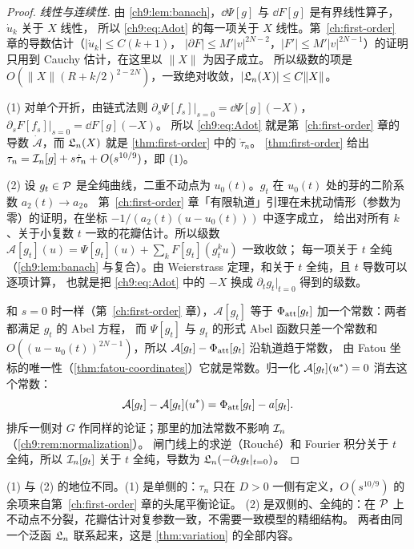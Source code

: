 \begin{proof}
\emph{线性与连续性.} 由 \cref{ch9:lem:banach}，$\dd\Psi[g]$ 与 $\dd F[g]$ 是有界线性算子，$\dot u_k$ 关于 $X$ 线性，
所以 \eqref{ch9:eq:Adot} 的每一项关于 $X$ 线性。第~\ref{ch:first-order} 章的导数估计（$|\dot u_k|\le C(k+1)$，
$|\partial F|\le M'|v|^{2N-2}$，$|F'|\le M'|v|^{2N-1}$）的证明只用到 Cauchy 估计，在这里以 $\|X\|$ 为因子成立。
所以级数的项是 $O(\|X\|(R+k/2)^{2-2N})$，一致绝对收敛，$|\mathfrak L_n(X)|\le C\|X\|$。

(1) 对单个开折，由链式法则 $\partial_s\Psi[f_s]|_{s=0}=\dd\Psi[g](-X)$，$\partial_sF[f_s]|_{s=0}=\dd F[g](-X)$。
所以 \eqref{ch9:eq:Adot} 就是第~\ref{ch:first-order} 章的导数 $\dot{\mathcal A}$，而 $\mathfrak L_n(X)$ 就是 \cref{thm:first-order} 中的 $\dot\tau_n$。
\cref{thm:first-order} 给出 $\tau_n=\mathcal I_n[g]+s\dot\tau_n+O(s^{10/9})$，即 (1)。

(2) 设 $g_t\in\mathcal P$ 是全纯曲线，二重不动点为 $u_0(t)$。$g_t$ 在 $u_0(t)$ 处的芽的二阶系数 $a_2(t)\to a_2$。
第~\ref{ch:first-order} 章「有限轨道」引理在未扰动情形（参数为零）的证明，在坐标 $-1/(a_2(t)(u-u_0(t)))$ 中逐字成立，
给出对所有 $k$、关于小复数 $t$ 一致的花瓣估计。所以级数 $\mathcal A[g_t](u)=\Psi[g_t](u)+\sum_kF[g_t](g_t^ku)$ 一致收敛；
每一项关于 $t$ 全纯（\cref{ch9:lem:banach} 与复合）。由 Weierstrass 定理，和关于 $t$ 全纯，且 $t$ 导数可以逐项计算，
也就是把 \eqref{ch9:eq:Adot} 中的 $-X$ 换成 $\partial_tg_t|_{t=0}$ 得到的级数。

和 $s=0$ 时一样（第~\ref{ch:first-order} 章），$\mathcal A[g_t]$ 等于 $\Phi_{\mathrm{att}}[g_t]$ 加一个常数：两者都满足 $g_t$ 的 Abel 方程，
而 $\Psi[g_t]$ 与 $g_t$ 的形式 Abel 函数只差一个常数和 $O((u-u_0(t))^{2N-1})$，所以 $\mathcal A[g_t]-\Phi_{\mathrm{att}}[g_t]$ 沿轨道趋于常数，
由 Fatou 坐标的唯一性（\cref{thm:fatou-coordinates}）它就是常数。归一化 $\mathcal A[g_t](u^{*})=0$ 消去这个常数：
\[
 \mathcal A[g_t]-\mathcal A[g_t](u^{*})=\Phi_{\mathrm{att}}[g_t]-a[g_t] .
\]
排斥一侧对 $G$ 作同样的论证；那里的加法常数不影响 $\mathcal I_n$（\cref{ch9:rem:normalization}）。
闸门线上的求逆（Rouché）和 Fourier 积分关于 $t$ 全纯，所以 $\mathcal I_n[g_t]$ 关于 $t$ 全纯，导数为 $\mathfrak L_n(-\partial_tg_t|_{t=0})$。
\end{proof}

\begin{remark}
(1) 与 (2) 的地位不同。(1) 是单侧的：$\tau_n$ 只在 $D>0$ 一侧有定义，$O(s^{10/9})$ 的余项来自第~\ref{ch:first-order} 章的头尾平衡论证。
(2) 是双侧的、全纯的：在 $\mathcal P$ 上不动点不分裂，花瓣估计对复参数一致，不需要一致模型的精细结构。
两者由同一个泛函 $\mathfrak L_n$ 联系起来，这是 \cref{thm:variation} 的全部内容。
\end{remark}

